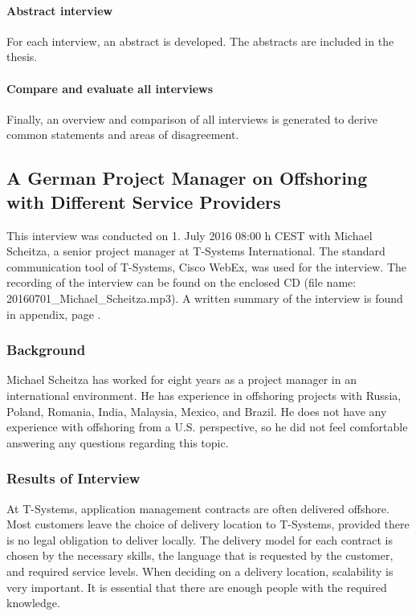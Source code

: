 \paragraph{Abstract interview} For each interview, an abstract is developed. The abstracts are included in the thesis.

\paragraph{Compare and evaluate all interviews} Finally, an overview and comparison of all interviews is generated to derive common statements and areas of disagreement.

\newpage
\subsection{A German Project Manager on Offshoring with Different Service Providers}

This interview was conducted on 1. July 2016 08:00 h CEST with Michael Scheitza, a senior project manager at T-Systems International. The standard communication tool of T-Systems, Cisco WebEx, was used for the interview. The recording of the interview can be found on the enclosed CD (file name: 20160701\_Michael\_Scheitza.mp3). A written summary of the interview is found in appendix, page \pageref{int:Scheitza}.

\subsubsection{Background}
Michael Scheitza has worked for eight years as a project manager in an international environment. He has experience in offshoring projects with Russia, Poland, Romania, India, Malaysia, Mexico, and Brazil. He does not have any experience with offshoring from a U.S. perspective, so he did not feel comfortable answering any questions regarding this topic. 
\subsubsection{Results of Interview}
At T-Systems, application management contracts are often delivered offshore. Most customers leave the choice of delivery location to T-Systems, provided there is no legal obligation to deliver locally. The delivery model for each contract is chosen by the necessary skills, the language that is requested by the customer, and required service levels. When deciding on a delivery location, scalability is very important. It is essential that there are enough people with the required knowledge.

